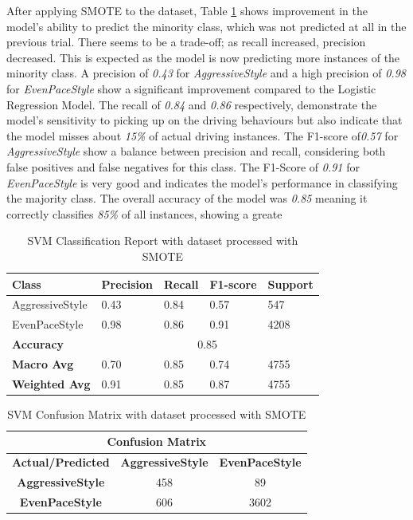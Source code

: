 \documentclass[10pt,journal,compsoc]{IEEEtran}
\begin{document}
After applying SMOTE to the dataset, Table \ref{table:classification_report_smote} shows improvement in the model's ability to predict the minority class, which was not predicted at all 
in the previous trial. There seems to be a trade-off; as recall increased, precision decreased. This is expected as the model is now predicting more instances of the minority class.
A precision of \textit{0.43} for \textit{AggressiveStyle} and a high precision of \textit{0.98} for \textit{EvenPaceStyle} show a significant improvement compared to the Logistic Regression Model.
The recall of \textit{0.84} and \textit{0.86} respectively, demonstrate the model's sensitivity to picking up on the driving behaviours but also indicate that the model misses about \textit{15\%} of actual driving instances. 
The F1-score of\textit{0.57} for \textit{AggressiveStyle} show a balance between precision and recall, considering both false positives and false negatives for this class. The F1-Score of \textit{0.91} for \textit{EvenPaceStyle} is 
very good and indicates the model's performance in classifying the majority class. The overall accuracy of the model was \textit{0.85} meaning it correctly classifies \textit{85\%} of all instances, showing a greate 

\begin{table}[h]
    \centering    
    \begin{tabular}{|l|l|l|l|l|}
    \hline
    \textbf{Class} & \textbf{Precision} & \textbf{Recall} & \textbf{F1-score} & \textbf{Support} \\ \hline
    AggressiveStyle & 0.43 & 0.84 & 0.57 & 547 \\ \hline
    EvenPaceStyle & 0.98 & 0.86 & 0.91 & 4208 \\ \hline
    \textbf{Accuracy} & \multicolumn{4}{c|}{0.85} \\ \hline
    \textbf{Macro Avg} & 0.70 & 0.85 & 0.74 & 4755 \\ \hline
    \textbf{Weighted Avg} & 0.91 & 0.85 & 0.87 & 4755 \\ \hline
    \end{tabular}
    \caption{SVM Classification Report with dataset processed with SMOTE}
    \label{table:classification_report_smote}
\end{table}

\begin{table}[h]
    \centering
    \begin{tabular}{|c|c|c|}
    \hline
    \multicolumn{3}{|c|}{\textbf{Confusion Matrix}} \\
    \hline
    \textbf{Actual/Predicted} & \textbf{AggressiveStyle} & \textbf{EvenPaceStyle} \\ \hline
    \textbf{AggressiveStyle} & 458 & 89 \\ \hline
    \textbf{EvenPaceStyle} & 606 & 3602 \\ \hline
    \end{tabular}
    \caption{SVM Confusion Matrix with dataset processed with SMOTE}
    \label{table:confusion_matrix_smote}
\end{table}
\end{document}

